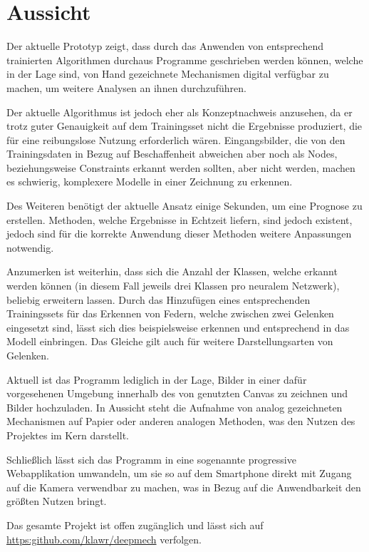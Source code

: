 \section{Aussicht}
Der aktuelle Prototyp zeigt, dass durch das Anwenden von entsprechend trainierten Algorithmen durchaus Programme geschrieben werden können, welche in der Lage sind, von Hand gezeichnete Mechanismen digital verfügbar zu machen, um weitere Analysen an ihnen durchzuführen.

Der aktuelle Algorithmus ist jedoch eher als Konzeptnachweis anzusehen, da er trotz guter Genauigkeit auf dem Trainingsset nicht die Ergebnisse produziert, die für eine reibungslose Nutzung erforderlich wären.
Eingangsbilder, die von den Trainingsdaten in Bezug auf Beschaffenheit abweichen aber noch als Nodes, beziehungsweise Constraints erkannt werden sollten, aber nicht werden, machen es schwierig, komplexere Modelle in einer Zeichnung zu erkennen.

Des Weiteren benötigt der aktuelle Ansatz einige Sekunden, um eine Prognose zu erstellen.
Methoden, welche Ergebnisse in Echtzeit liefern, sind jedoch existent\cite{Redmon2015}\cite{Redmon2016}\cite{Redmon2018}, jedoch sind für die korrekte Anwendung dieser Methoden weitere Anpassungen notwendig.

Anzumerken ist weiterhin, dass sich die Anzahl der Klassen, welche erkannt werden können (in diesem Fall jeweils drei Klassen pro neuralem Netzwerk), beliebig erweitern lassen.
Durch das Hinzufügen eines entsprechenden Trainingssets für das Erkennen von Federn, welche zwischen zwei Gelenken eingesetzt sind, lässt sich dies beispielsweise erkennen und entsprechend in das  Modell einbringen.
Das Gleiche gilt auch für weitere Darstellungsarten von Gelenken.

Aktuell ist das Programm lediglich in der Lage, Bilder in einer dafür vorgesehenen Umgebung innerhalb des von  genutzten Canvas zu zeichnen und Bilder hochzuladen.
In Aussicht steht die Aufnahme von analog gezeichneten Mechanismen auf Papier oder anderen analogen Methoden, was den Nutzen des Projektes im Kern darstellt.

Schlie{\ss}lich lässt sich das Programm in eine sogenannte progressive Webapplikation umwandeln, um sie so auf dem Smartphone direkt mit Zugang auf die Kamera verwendbar zu machen, was in Bezug auf die Anwendbarkeit den grö{\ss}ten Nutzen bringt.

Das gesamte Projekt ist offen zugänglich und lässt sich auf \url{https:github.com/klawr/deepmech} verfolgen.

